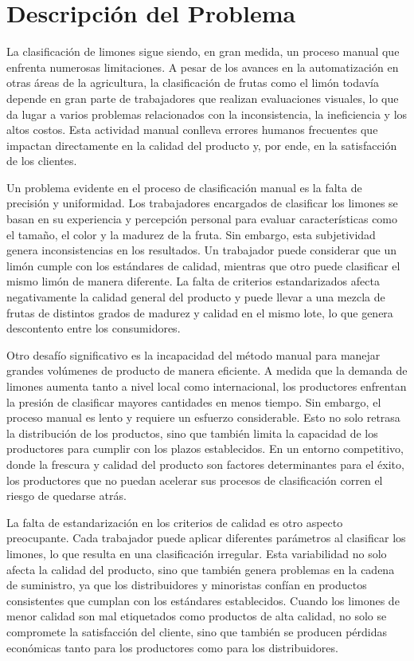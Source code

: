 \section{Descripción del Problema}

La clasificación de limones sigue siendo, en gran medida, un proceso manual que enfrenta numerosas limitaciones. A pesar de los avances en la automatización en otras áreas de la agricultura, la clasificación de frutas como el limón todavía depende en gran parte de trabajadores que realizan evaluaciones visuales, lo que da lugar a varios problemas relacionados con la inconsistencia, la ineficiencia y los altos costos. Esta actividad manual conlleva errores humanos frecuentes que impactan directamente en la calidad del producto y, por ende, en la satisfacción de los clientes.

Un problema evidente en el proceso de clasificación manual es la falta de precisión y uniformidad. Los trabajadores encargados de clasificar los limones se basan en su experiencia y percepción personal para evaluar características como el tamaño, el color y la madurez de la fruta. Sin embargo, esta subjetividad genera inconsistencias en los resultados. Un trabajador puede considerar que un limón cumple con los estándares de calidad, mientras que otro puede clasificar el mismo limón de manera diferente. La falta de criterios estandarizados afecta negativamente la calidad general del producto y puede llevar a una mezcla de frutas de distintos grados de madurez y calidad en el mismo lote, lo que genera descontento entre los consumidores.

Otro desafío significativo es la incapacidad del método manual para manejar grandes volúmenes de producto de manera eficiente. A medida que la demanda de limones aumenta tanto a nivel local como internacional, los productores enfrentan la presión de clasificar mayores cantidades en menos tiempo. Sin embargo, el proceso manual es lento y requiere un esfuerzo considerable. Esto no solo retrasa la distribución de los productos, sino que también limita la capacidad de los productores para cumplir con los plazos establecidos. En un entorno competitivo, donde la frescura y calidad del producto son factores determinantes para el éxito, los productores que no puedan acelerar sus procesos de clasificación corren el riesgo de quedarse atrás.

La falta de estandarización en los criterios de calidad es otro aspecto preocupante. Cada trabajador puede aplicar diferentes parámetros al clasificar los limones, lo que resulta en una clasificación irregular. Esta variabilidad no solo afecta la calidad del producto, sino que también genera problemas en la cadena de suministro, ya que los distribuidores y minoristas confían en productos consistentes que cumplan con los estándares establecidos. Cuando los limones de menor calidad son mal etiquetados como productos de alta calidad, no solo se compromete la satisfacción del cliente, sino que también se producen pérdidas económicas tanto para los productores como para los distribuidores.


